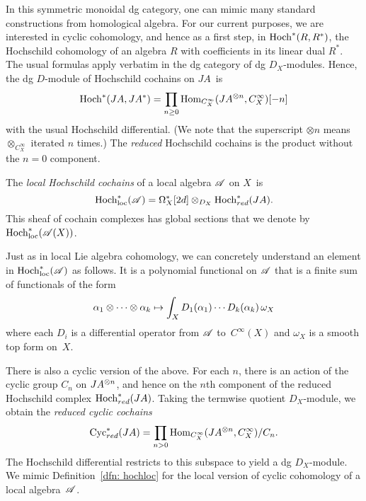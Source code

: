 
In this symmetric monoidal dg category, 
one can mimic many standard constructions from homological algebra.
For our current purposes, we are interested in cyclic cohomology,
and hence as a first step, in $\Hoch^*(R,R^*)$, the Hochschild cohomology of an algebra $R$ with coefficients in its linear dual $R^*$.
The usual formulas apply verbatim in the dg category of dg $D_X$-modules.
Hence, the dg $D$-module of Hochschild cochains on $JA$~is 
\[
\Hoch^* (JA, JA^*) = \prod_{n \geq 0} {\rm Hom}_{C^\infty_X} (JA^{\tensor n}, C^\infty_X)[-n]
\]
with the usual Hochschild differential.
(We note that the superscript $\otimes n$ means $\otimes_{C^\infty_X}$ iterated $n$ times.)
The {\em reduced} Hochschild cochains is the product without the $n=0$ component. 

\def\Hoch{{\rm Hoch}}
\def\Hochloc{{\rm Hoch}_{\rm loc}}
\def\Cyc{{\rm Cyc}}
\def\Cycloc{{\rm Cyc}_{\rm loc}}


\begin{dfn}\label{dfn: hochloc}
The {\em local Hochschild cochains} of a local algebra $\mathscr A$ on $X$~is 
\[
\Hochloc^*(\sA) = \Omega^*_X[2d] \tensor_{D_X} \Hoch^*_{red} (JA) .
\] 
This sheaf of cochain complexes has global sections that we denote by~$\Hochloc^*(\sA(X))$.
\end{dfn}

Just as in local Lie algebra cohomology, we can concretely understand an element in $\Hochloc^*(\sA)$ as follows.
It is a polynomial functional  on $\mathscr A$ that is a finite sum of functionals of the form
\[
\alpha_1 \otimes \cdots \otimes \alpha_k \mapsto \int_X  D_1(\alpha_1) \cdots D_k(\alpha_k) \, \omega_X
\]
where each $D_i$ is a differential operator from $\mathscr A$ to~$C^\infty(X)$ and $\omega_X$ is a smooth top form on~$X$. 

There is also a cyclic version of the above. 
For each $n$, there is an action of the cyclic group $C_n$ on $JA^{\otimes n}$,
and hence on the $n$th component of the reduced Hochschild complex $\Hoch_{red}^* (JA)$.
Taking the termwise quotient $D_X$-module, we obtain the {\em reduced cyclic cochains}
\[
\Cyc_{red}^* (JA) = \prod_{n > 0} {\rm Hom}_{C^\infty_X} (JA^{\tensor n}, C^\infty_X) / C_n .
\]
The Hochschild differential restricts to this subspace to yield a dg $D_X$-module. 
We mimic Definition~\ref{dfn: hochloc} for the local version of cyclic cohomology of a local algebra~$\mathscr A$. 

